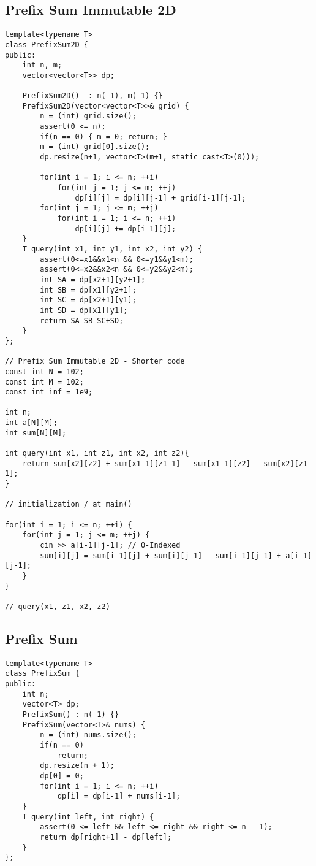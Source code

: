 \documentclass[10pt,letterpaper,twocolumn,twosided]{article}
\begin{document}
\subsection{Prefix Sum Immutable 2D}
\begin{lstlisting}
template<typename T>
class PrefixSum2D {
public:
    int n, m;
    vector<vector<T>> dp;

    PrefixSum2D()  : n(-1), m(-1) {}
    PrefixSum2D(vector<vector<T>>& grid) {
        n = (int) grid.size();
        assert(0 <= n);
        if(n == 0) { m = 0; return; }
        m = (int) grid[0].size();
        dp.resize(n+1, vector<T>(m+1, static_cast<T>(0)));
        
        for(int i = 1; i <= n; ++i)
            for(int j = 1; j <= m; ++j)
                dp[i][j] = dp[i][j-1] + grid[i-1][j-1];
        for(int j = 1; j <= m; ++j)
            for(int i = 1; i <= n; ++i)
                dp[i][j] += dp[i-1][j];
    }
    T query(int x1, int y1, int x2, int y2) {
        assert(0<=x1&&x1<n && 0<=y1&&y1<m);
        assert(0<=x2&&x2<n && 0<=y2&&y2<m);
        int SA = dp[x2+1][y2+1];
        int SB = dp[x1][y2+1];
        int SC = dp[x2+1][y1];
        int SD = dp[x1][y1];
        return SA-SB-SC+SD;
    }
};

// Prefix Sum Immutable 2D - Shorter code
const int N = 102;
const int M = 102;
const int inf = 1e9;

int n;
int a[N][M];
int sum[N][M];

int query(int x1, int z1, int x2, int z2){
    return sum[x2][z2] + sum[x1-1][z1-1] - sum[x1-1][z2] - sum[x2][z1-1];
}

// initialization / at main()

for(int i = 1; i <= n; ++i) {
    for(int j = 1; j <= m; ++j) {
        cin >> a[i-1][j-1]; // 0-Indexed
        sum[i][j] = sum[i-1][j] + sum[i][j-1] - sum[i-1][j-1] + a[i-1][j-1];
    }
}

// query(x1, z1, x2, z2)
\end{lstlisting}

\subsection{Prefix Sum}
\begin{lstlisting}
template<typename T>
class PrefixSum {
public:
    int n;
    vector<T> dp;
    PrefixSum() : n(-1) {}
    PrefixSum(vector<T>& nums) {
        n = (int) nums.size();
        if(n == 0)
            return;
        dp.resize(n + 1);
        dp[0] = 0;
        for(int i = 1; i <= n; ++i)
            dp[i] = dp[i-1] + nums[i-1];
    }
    T query(int left, int right) {
        assert(0 <= left && left <= right && right <= n - 1);
        return dp[right+1] - dp[left];
    }
};
\end{lstlisting}
\end{document}
